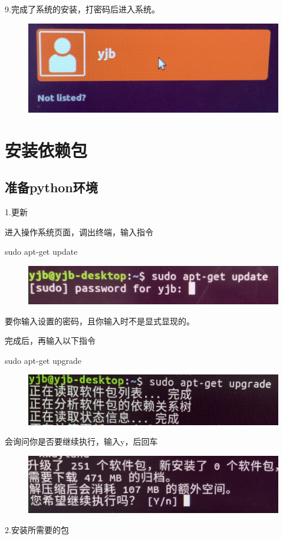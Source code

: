 \documentclass[openbib]{article}
\begin{document}
9.完成了系统的安装，打密码后进入系统。
\begin{figure}[H]
	\centering
	\includegraphics[scale=0.3]{c2}
\end{figure}
\section{安装依赖包}
\subsection{准备python环境}
1.更新

进入操作系统页面，调出终端，输入指令

sudo apt-get update

\begin{figure}[H]
	\centering
	\includegraphics[scale=0.3]{c3}
\end{figure}

要你输入设置的密码，且你输入时不是显式显现的。

完成后，再输入以下指令

sudo apt-get upgrade

\begin{figure}[H]
	\centering
	\includegraphics[scale=0.3]{c4}
\end{figure}
会询问你是否要继续执行，输入y，后回车
\begin{figure}[H]
	\centering
	\includegraphics[scale=0.3]{c5}
\end{figure}
2.安装所需要的包
\end{document}
